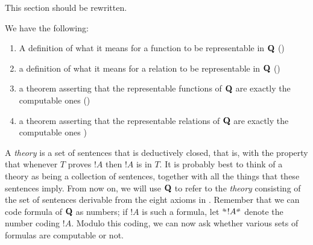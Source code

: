 \documentclass[../../../include/open-logic-section]{subfiles}
\begin{document}


\begin{editorial}
This section should be rewritten.  
\end{editorial}

We have the following:
\begin{enumerate}
\item A definition of what it means for a function to be representable
  in $\mathbf{Q}$ ()
\item a definition of what it means for a relation to be representable
  in $\mathbf{Q}$ ()
\item a theorem asserting that the representable functions of $\mathbf{Q}$
  are exactly the computable ones
  ()
\item a theorem asserting that the representable relations of $\mathbf{Q}$
  are exactly the computable ones
  )
\end{enumerate}

A {\em theory} is a set of sentences that is deductively closed, that
is, with the property that whenever $T$ proves $!A$ then $!A$ is in
$T$. It is probably best to think of a theory as being a collection of
sentences, together with all the things that these sentences imply.
From now on, we will use $\mathbf{Q}$ to refer to the {\em theory}
consisting of the set of sentences derivable from the eight axioms in
.  Remember that we can code formula of $\mathbf{Q}$
as numbers; if $!A$ is such a formula, let $\Gn{!A}$ denote the number
coding $!A$. Modulo this coding, we can now ask whether various sets
of formulas are computable or not.
\end{document}
